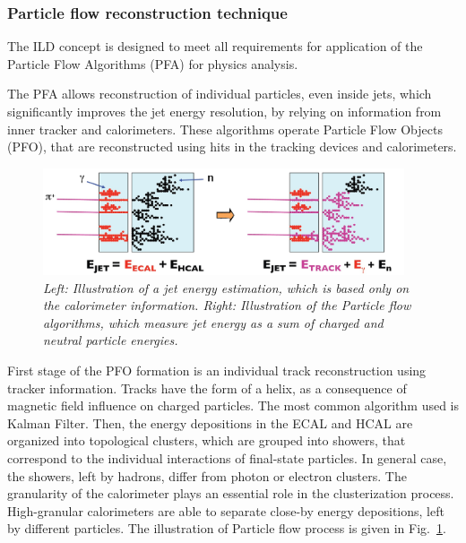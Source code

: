 

\subsubsection{Particle flow reconstruction technique}
The ILD concept is designed to meet all requirements for application of the Particle Flow Algorithms (PFA) for physics analysis. 

The PFA allows reconstruction of individual particles, even inside jets, which significantly improves the jet energy resolution, by relying on information from inner tracker and calorimeters.
These algorithms operate Particle Flow Objects (PFO), that are reconstructed using hits in the tracking devices and calorimeters. 

\begin{figure}[H]
{\centering
    \includegraphics[width=0.95\textwidth]{graphics/calirometry_traditional_new.jpg}
    \caption{\sl Left: Illustration of a jet energy estimation, which is based only on the calorimeter information. Right: Illustration of the Particle flow algorithms, which measure jet energy as a sum of charged and neutral particle energies.}
    \label{fig:PFAillustration}
  }
\end{figure}

First stage of the PFO formation is an individual track reconstruction using tracker information. Tracks have the form of a helix, as a consequence of magnetic field influence on charged particles.  The most common algorithm used is Kalman Filter.
Then, the energy depositions in the ECAL and HCAL are organized into topological clusters, which are grouped into showers, that correspond to the individual interactions of final-state particles. In general case, the showers, left by hadrons, differ from photon or electron clusters. The granularity of the calorimeter plays an essential role in the clusterization process. High-granular calorimeters are able to separate close-by energy depositions, left by different particles. The illustration of Particle flow process is given in Fig.~\ref{fig:PFAillustration}.

